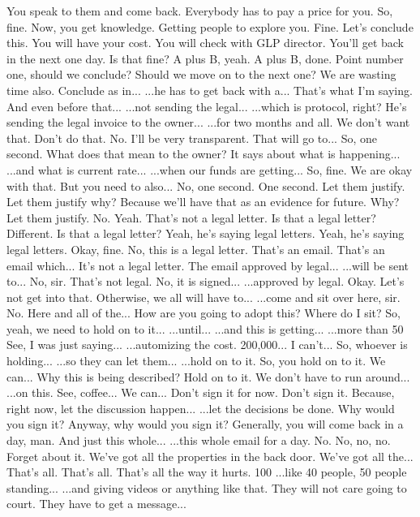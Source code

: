 You speak to them and come back.
Everybody has to pay a price for you.
So, fine.
Now, you get knowledge.
Getting people to explore you.
Fine.
Let's conclude this.
You will have your cost.
You will check with GLP director.
You'll get back in the next one day.
Is that fine?
A plus B, yeah.
A plus B, done.
Point number one, should we conclude?
Should we move on to the next one?
We are wasting time also.
Conclude as in...
...he has to get back with a...
That's what I'm saying.
And even before that...
...not sending the legal...
...which is protocol, right?
He's sending the legal invoice to the owner...
...for two months and all.
We don't want that.
Don't do that.
No.
I'll be very transparent.
That will go to...
So, one second.
What does that mean to the owner?
It says about what is happening...
...and what is current rate...
...when our funds are getting...
So, fine.
We are okay with that.
But you need to also...
No, one second.
One second.
Let them justify.
Let them justify why?
Because we'll have that as an evidence for future.
Why?
Let them justify.
No.
Yeah.
That's not a legal letter.
Is that a legal letter?
Different.
Is that a legal letter?
Yeah, he's saying legal letters.
Yeah, he's saying legal letters.
Okay, fine.
No, this is a legal letter.
That's an email.
That's an email which...
It's not a legal letter.
The email approved by legal...
...will be sent to...
No, sir.
That's not legal.
No, it is signed...
...approved by legal.
Okay.
Let's not get into that.
Otherwise, we all will have to...
...come and sit over here, sir.
No.
Here and all of the...
How are you going to adopt this?
Where do I sit?
So, yeah, we need to hold on to it...
...until...
...and this is getting...
...more than 50%
See, I was just saying...
...automizing the cost.
200,000...
I can't...
So, whoever is holding...
...so they can let them...
...hold on to it.
So, you hold on to it.
We can...
Why this is being described?
Hold on to it.
We don't have to run around...
...on this.
See, coffee...
We can...
Don't sign it for now.
Don't sign it.
Because, right now, let the discussion happen...
...let the decisions be done.
Why would you sign it?
Anyway, why would you sign it?
Generally, you will come back in a day, man.
And just this whole...
...this whole email for a day.
No.
No, no, no.
Forget about it.
We've got all the properties in the back door.
We've got all the...
That's all.
That's all.
That's all the way it hurts.
100%
...like 40 people, 50 people standing...
...and giving videos or anything like that.
They will not care going to court.
They have to get a message...
